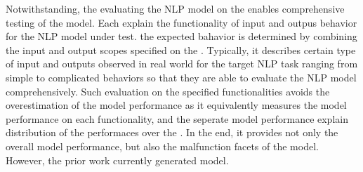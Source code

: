 Notwithstanding, the evaluating the NLP model on the \lcs enables
comprehensive testing of the model. Each \lc explain the functionality
of input and outpus behavior for the NLP model under test. the
expected bahavior is determined by combining the input and output
scopes specified on the \lc. Typically, it describes certain type of
input and outputs observed in real world for the target NLP task
ranging from simple to complicated behaviors so that they are able to
evaluate the NLP model comprehensively. Such evaluation on the
specified functionalities avoids the overestimation of the model
performance as it equivalently measures the model performance on each
functionality, and the seperate model performance explain distribution
of the performaces over the \lcs. In the end, it provides not only the
overall model performance, but also the malfunction facets of the
model. However, the prior work currently generated model.





